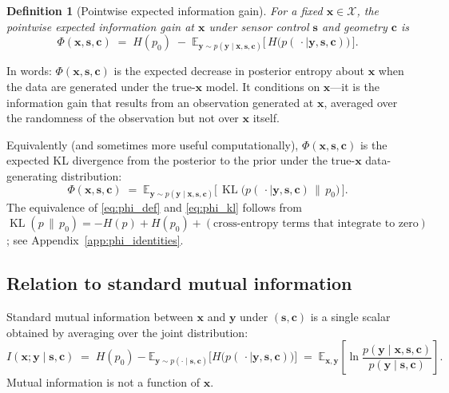 \documentclass[11pt,a4paper]{article}
\newcommand{\E}{\mathbb{E}}
\newcommand{\KL}{\operatorname{KL}}
\newtheorem{definition}{Definition}
\begin{document}
\begin{definition}[Pointwise expected information gain]
\label{def:phi}
For a fixed $\bm{x}\in\mathcal{X}$, the \emph{pointwise expected information gain} at $\bm{x}$ under sensor control $\bm{s}$ and geometry $\bm{c}$ is
\begin{equation}
  \boxed{\;
  \Phi(\bm{x}, \bm{s}, \bm{c}) \;=\; H(p_0) \;-\; \E_{\bm{y} \sim p(\bm{y}\mid \bm{x}, \bm{s}, \bm{c})}\!\bigl[\, H\!\bigl(p(\,\cdot\mid\bm{y}, \bm{s}, \bm{c})\bigr) \,\bigr].
  \;}
  \label{eq:phi_def}
\end{equation}
\end{definition}

In words: $\Phi(\bm{x}, \bm{s}, \bm{c})$ is the expected decrease in posterior entropy about $\bm{x}$ when the data are generated under the true-$\bm{x}$ model.  It conditions on $\bm{x}$---it is the information gain that results from an observation generated at $\bm{x}$, averaged over the randomness of the observation but not over $\bm{x}$ itself.

Equivalently (and sometimes more useful computationally), $\Phi(\bm{x}, \bm{s}, \bm{c})$ is the expected KL divergence from the posterior to the prior under the true-$\bm{x}$ data-generating distribution:
\begin{equation}
  \Phi(\bm{x}, \bm{s}, \bm{c}) \;=\; \E_{\bm{y} \sim p(\bm{y}\mid \bm{x}, \bm{s}, \bm{c})}\!\bigl[\,\KL\!\bigl(p(\,\cdot\mid\bm{y}, \bm{s}, \bm{c}) \,\big\|\, p_0\bigr)\,\bigr].
  \label{eq:phi_kl}
\end{equation}
The equivalence of \eqref{eq:phi_def} and \eqref{eq:phi_kl} follows from $\KL(p \,\|\, p_0) = -H(p) + H(p_0) + (\text{cross-entropy terms that integrate to zero})$; see Appendix~\ref{app:phi_identities}.

\subsection{Relation to standard mutual information}

Standard mutual information between $\bm{x}$ and $\bm{y}$ under $(\bm{s}, \bm{c})$ is a single scalar obtained by averaging over the joint distribution:
\begin{equation}
  I(\bm{x}; \bm{y} \mid \bm{s}, \bm{c})
  \;=\; H(p_0) - \E_{\bm{y} \sim p(\cdot \mid \bm{s}, \bm{c})}\!\bigl[H\!\bigl(p(\,\cdot\mid\bm{y},\bm{s},\bm{c})\bigr)\bigr]
  \;=\; \E_{\bm{x}, \bm{y}}\!\left[\ln \frac{p(\bm{y}\mid\bm{x},\bm{s},\bm{c})}{p(\bm{y}\mid\bm{s},\bm{c})}\right].
\end{equation}
Mutual information is not a function of $\bm{x}$.
\end{document}

